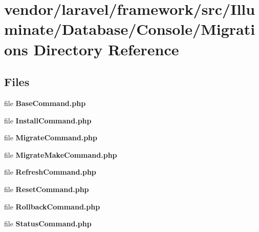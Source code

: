 \section{vendor/laravel/framework/src/\+Illuminate/\+Database/\+Console/\+Migrations Directory Reference}
\label{dir_d472813329664b9a5ec6adafa8425733}
\subsection*{Files}
\begin{DoxyCompactItemize}
\item 
file {\bf Base\+Command.\+php}
\item 
file {\bf Install\+Command.\+php}
\item 
file {\bf Migrate\+Command.\+php}
\item 
file {\bf Migrate\+Make\+Command.\+php}
\item 
file {\bf Refresh\+Command.\+php}
\item 
file {\bf Reset\+Command.\+php}
\item 
file {\bf Rollback\+Command.\+php}
\item 
file {\bf Status\+Command.\+php}
\end{DoxyCompactItemize}
